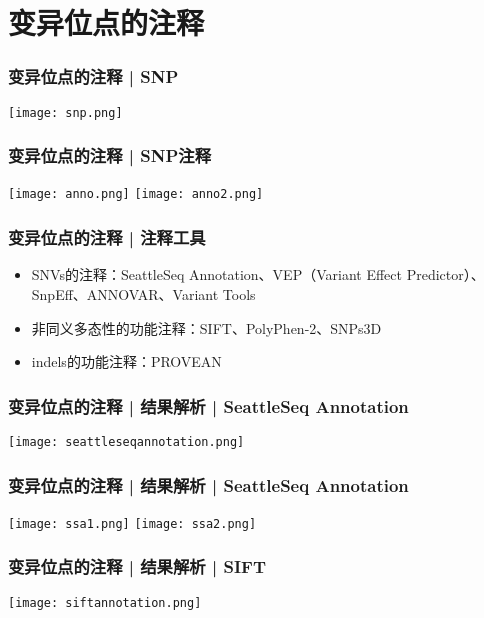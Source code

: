 \section{变异位点的注释}
\begin{frame}
  \frametitle{变异位点的注释 | SNP}
    \begin{center}
      \texttt{[image: snp.png]}
    \end{center}
\end{frame}

\begin{frame}
  \frametitle{变异位点的注释 | \alert{SNP注释}}
    \begin{center}
      \texttt{[image: anno.png]}
      \vspace{0.5cm}
      \texttt{[image: anno2.png]}
    \end{center}
\end{frame}

\begin{frame}
  \frametitle{变异位点的注释 | 注释工具}
  \begin{itemize}
    \item SNVs的注释：SeattleSeq Annotation、VEP（Variant Effect Predictor）、SnpEff、ANNOVAR、Variant Tools
    \item 非同义多态性的功能注释：SIFT、PolyPhen-2、SNPs3D
    \item indels的功能注释：PROVEAN
  \end{itemize}
\end{frame}

\begin{frame}
  \frametitle{变异位点的注释 | \alert{结果解析} | SeattleSeq Annotation}
    \begin{center}
      \texttt{[image: seattleseqannotation.png]}
    \end{center}
\end{frame}

\begin{frame}
  \frametitle{变异位点的注释 | \alert{结果解析} | SeattleSeq Annotation}
    \begin{center}
      \texttt{[image: ssa1.png]}
      \vspace{0.5cm}
      \texttt{[image: ssa2.png]}
    \end{center}
\end{frame}

\begin{frame}
  \frametitle{变异位点的注释 | \alert{结果解析} | SIFT}
    \begin{center}
      \texttt{[image: siftannotation.png]}
    \end{center}
\end{frame}

